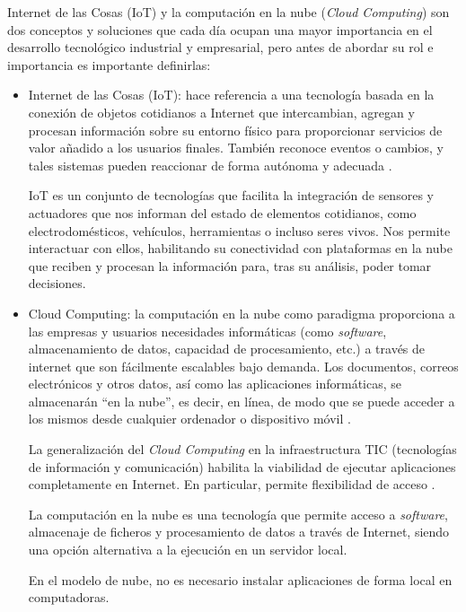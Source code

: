 Internet de las Cosas (IoT) y la computación en la nube (\emph{Cloud Computing}) son dos conceptos y soluciones que cada día ocupan una mayor importancia en el desarrollo tecnológico industrial y empresarial, pero antes de abordar su rol e importancia es importante definirlas:



\begin{itemize}
\item Internet de las Cosas (IoT): hace referencia a una tecnología basada en la conexión de objetos cotidianos a Internet que intercambian, agregan y procesan información sobre su entorno físico para proporcionar servicios de valor añadido a los usuarios finales. También reconoce eventos o cambios, y tales sistemas pueden reaccionar de forma autónoma y adecuada \citep{BOOK:1}.

IoT es un conjunto de tecnologías que facilita la integración de sensores y actuadores que nos informan del estado de elementos cotidianos, como electrodomésticos, vehículos, herramientas o incluso seres vivos. Nos permite interactuar con ellos, habilitando su conectividad con plataformas en la nube que reciben y procesan la información para, tras su análisis, poder tomar decisiones.

\item Cloud Computing: la computación en la nube como paradigma proporciona a las empresas y usuarios necesidades informáticas (como \emph{software}, almacenamiento de datos, capacidad de procesamiento, etc.) a través de internet que son fácilmente escalables bajo demanda. Los documentos, correos electrónicos y otros datos, así como las aplicaciones informáticas, se almacenarán ``en la nube'', es decir, en línea, de modo que se puede acceder a los mismos desde cualquier ordenador o dispositivo móvil \citep{BOOK:1}.

La generalización del \emph{Cloud Computing} en la infraestructura TIC (tecnologías de información y comunicación) habilita la viabilidad de ejecutar aplicaciones completamente en Internet. En particular, permite flexibilidad de acceso \citep{BOOK:1}.

La computación en la nube es una tecnología que permite acceso a \emph{software}, almacenaje de ficheros y procesamiento de datos a través de Internet, siendo una opción alternativa a la ejecución en un servidor local. 

En el modelo de nube, no es necesario instalar aplicaciones de forma local en computadoras.

\end{itemize}


